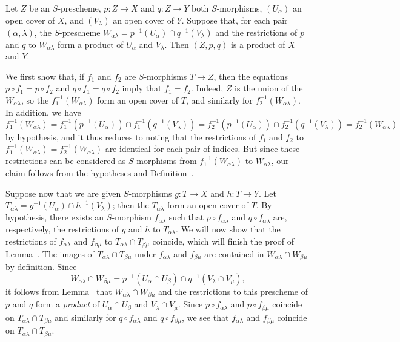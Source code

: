 \begin{lemma}[3.2.6.2]
\label{I.3.2.6.2}
Let $Z$ be an $S$-prescheme, $p:Z\to X$ and $q:Z\to Y$ both $S$-morphisms, $(U_\alpha)$ an open
cover of $X$, and $(V_\lambda)$ an open cover of $Y$. Suppose that, for each pair
$(\alpha,\lambda)$, the $S$-prescheme
$W_{\alpha\lambda}=p^{-1}(U_\alpha)\cap q^{-1}(V_\lambda)$ and the restrictions of $p$ and
$q$ to $W_{\alpha\lambda}$ form a product of $U_\alpha$ and $V_\lambda$. Then $(Z,p,q)$ is a
product of $X$ and $Y$.
\end{lemma}

We first show that, if $f_1$ and $f_2$ are $S$-morphisms $T\to Z$, then the equations
$p\circ f_1=p\circ f_2$ and $q\circ f_1=q\circ f_2$ imply that $f_1=f_2$. Indeed, $Z$ is the union
of the $W_{\alpha\lambda}$, so the $f_1^{-1}(W_{\alpha\lambda})$ form an open cover of $T$,
and similarly for $f_2^{-1}(W_{\alpha\lambda})$. In addition, we have
\[
  f_1^{-1}(W_{\alpha\lambda})=f_1^{-1}(p^{-1}(U_\alpha))\cap f_1^{-1}(q^{-1}(V_\lambda))
  =f_2^{-1}(p^{-1}(U_\alpha))\cap f_2^{-1}(q^{-1}(V_\lambda))=f_2^{-1}(W_{\alpha\lambda})
\]
by hypothesis, and it thus reduces to noting that the restrictions of $f_1$ and $f_2$ to
$f_1^{-1}(W_{\alpha\lambda})=f_2^{-1}(W_{\alpha\lambda})$ are identical for each pair of
indices. But since these restrictions can be considered as $S$-morphisms from
$f_1^{-1}(W_{\alpha\lambda})$ to $W_{\alpha\lambda}$, our claim follows from the
hypotheses and Definition~.

Suppose now that we are given $S$-morphisms $g:T\to X$ and $h:T\to Y$. Let
$T_{\alpha\lambda}=g^{-1}(U_\alpha)\cap h^{-1}(V_\lambda)$; then the $T_{\alpha\lambda}$ form an
open cover of $T$. By hypothesis, there exists an $S$-morphism $f_{\alpha\lambda}$ such that
$p\circ f_{\alpha\lambda}$ and $q\circ f_{\alpha\lambda}$ are, respectively, the restrictions of
$g$ and $h$ to $T_{\alpha\lambda}$. We will now show that the restrictions of
$f_{\alpha\lambda}$ and $f_{\beta\mu}$ to $T_{\alpha\lambda}\cap T_{\beta\mu}$ coincide,
which will finish the proof of Lemma~. The images of
$T_{\alpha\lambda}\cap T_{\beta\mu}$ under $f_{\alpha\lambda}$ and $f_{\beta\mu}$ are
contained in $W_{\alpha\lambda}\cap W_{\beta\mu}$ by definition. Since
\[
  W_{\alpha\lambda}\cap W_{\beta\mu}
  =p^{-1}(U_\alpha\cap U_\beta)\cap q^{-1}(V_\lambda\cap V_\mu),
\]
it follows from Lemma~ that $W_{\alpha\lambda}\cap W_{\beta\mu}$ and the
restrictions to this prescheme of $p$ and $q$ form a \emph{product} of $U_\alpha\cap U_\beta$
and $V_\lambda\cap V_\mu$. Since $p\circ f_{\alpha\lambda}$ and $p\circ f_{\beta\mu}$ coincide
on $T_{\alpha\lambda}\cap T_{\beta\mu}$ and similarly for $q\circ f_{\alpha\lambda}$ and
$q\circ f_{\beta\mu}$, we see that $f_{\alpha\lambda}$ and $f_{\beta\mu}$ coincide on
$T_{\alpha\lambda}\cap T_{\beta\mu}$.

